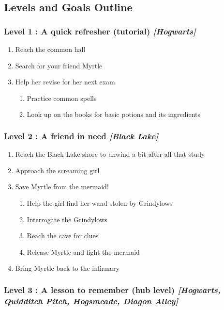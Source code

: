 \pagebreak

\subsection{Levels and Goals Outline}

\subsubsection{Level 1 : A quick refresher (tutorial) \textit{[Hogwarts]}}
\begin{enumerate}[1)]
	\item Reach the common hall
	\item Search for your friend Myrtle
	\item Help her revise for her next exam
	\begin{enumerate}[1.]
		\item Practice common spells
		\item Look up on the books for basic potions and its ingredients
	\end{enumerate}
\end{enumerate}

\subsubsection{Level 2 : A friend in need \textit{[Black Lake]}}
\begin{enumerate}[1)]
	\item Reach the Black Lake shore to unwind a bit after all that study
	\item Approach the screaming girl
	\item Save Myrtle from the mermaid!
	\begin{enumerate}[1.]
		\item Help the girl find her wand stolen by Grindylows
		\item Interrogate the Grindylows
		\item Reach the cave for clues
		\item Release Myrtle and fight the mermaid
	\end{enumerate}
	\item Bring Myrtle back to the infirmary
\end{enumerate}

\subsubsection{Level 3 : A lesson to remember (hub level) \textit{[Hogwarts, Quidditch Pitch, Hogsmeade, Diagon Alley]}}

